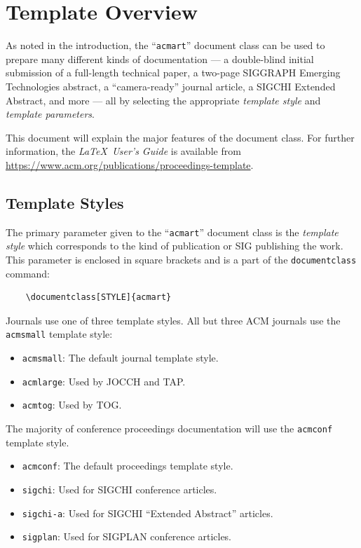 \documentclass[sigconf]{acmart}
\begin{document}
	\section{Template Overview}
	As noted in the introduction, the ``\verb|acmart|'' document class can be used to prepare many different kinds of documentation --- a double-blind initial submission of a full-length technical paper, a two-page SIGGRAPH Emerging Technologies abstract, a ``camera-ready'' journal article, a SIGCHI Extended Abstract, and more --- all by selecting the appropriate {\it template style} and {\it template parameters}.
	
	This document will explain the major features of the document class. For further information, the {\it \LaTeX\ User's Guide} is available from \url{https://www.acm.org/publications/proceedings-template}.
	
	\subsection{Template Styles}
	
	The primary parameter given to the ``\verb|acmart|'' document class is the {\it template style} which corresponds to the kind of publication or SIG publishing the work. This parameter is enclosed in square brackets and is a part of the {\verb|documentclass|} command:
	\begin{verbatim}
	\documentclass[STYLE]{acmart}
	\end{verbatim}
	
	Journals use one of three template styles. All but three ACM journals use the {\verb|acmsmall|} template style:
	\begin{itemize}
		\item {\verb|acmsmall|}: The default journal template style.
		\item {\verb|acmlarge|}: Used by JOCCH and TAP.
		\item {\verb|acmtog|}: Used by TOG.
	\end{itemize}
	
	The majority of conference proceedings documentation will use the {\verb|acmconf|} template style.
	\begin{itemize}
		\item {\verb|acmconf|}: The default proceedings template style.
		\item{\verb|sigchi|}: Used for SIGCHI conference articles.
		\item{\verb|sigchi-a|}: Used for SIGCHI ``Extended Abstract'' articles.
		\item{\verb|sigplan|}: Used for SIGPLAN conference articles.
	\end{itemize}
	
\end{document}
